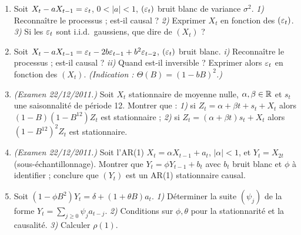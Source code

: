 \documentclass[11pt]{article}
\begin{document}
\begin{enumerate}[label=\textbf{Q\,B.\arabic*},leftmargin=*]
\item Soit $X_t-aX_{t-1}=\varepsilon_t$, $0<|a|<1$, $(\varepsilon_t)$ bruit blanc de variance $\sigma^2$.
\emph{1)} Reconnaître le processus ; est-il causal ? \emph{2)} Exprimer $X_t$ en fonction des
$(\varepsilon_t)$. \emph{3)} Si les $\varepsilon_t$ sont i.i.d.\ gaussiens, que dire de $(X_t)$ ?

\item Soit $X_t-aX_{t-1}=\varepsilon_t-2b\varepsilon_{t-1}+b^2\varepsilon_{t-2}$, $(\varepsilon_t)$ bruit blanc.
\emph{i)} Reconnaître le processus ; est-il causal ? \emph{ii)} Quand est-il inversible ?
Exprimer alors $\varepsilon_t$ en fonction des $(X_t)$. \emph{(Indication : $\Theta(B)=(1-bB)^2$.)}

\item \emph{(Examen 22/12/2011.)} Soit $X_t$ stationnaire de moyenne nulle, $\alpha,\beta\in\mathbb{R}$
et $s_t$ une saisonnalité de période 12. Montrer que :
\emph{1)} si $Z_t=\alpha+\beta t+s_t+X_t$ alors $(1-B)(1-B^{12})Z_t$ est stationnaire ;
\emph{2)} si $Z_t=(\alpha+\beta t)s_t+X_t$ alors $(1-B^{12})^2Z_t$ est stationnaire.

\item \emph{(Examen 22/12/2011.)} Soit l'AR(1) $X_t=\alpha X_{t-1}+a_t$, $|\alpha|<1$, et
$Y_t=X_{2t}$ (sous-échantillonnage). Montrer que $Y_t=\phi Y_{t-1}+b_t$ avec $b_t$ bruit
blanc et $\phi$ à identifier ; conclure que $(Y_t)$ est un AR(1) stationnaire causal.

\item Soit $(1-\phi B^2)Y_t=\delta+(1+\theta B)a_t$.
\emph{1)} Déterminer la suite $(\psi_j)$ de la forme $Y_t=\sum_{j\ge0}\psi_j a_{t-j}$.
\emph{2)} Conditions sur $\phi,\theta$ pour la stationnarité et la causalité.
\emph{3)} Calculer $\rho(1)$.
\end{enumerate}

\end{document}
